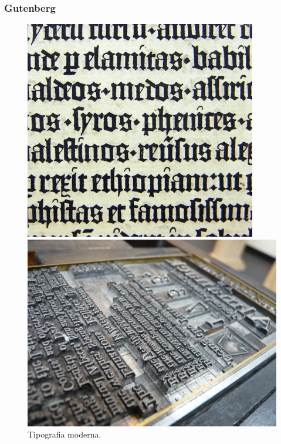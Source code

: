 \begin{frame}
\frametitle{Gutenberg}
\begin{figure}[htbp]
\begin{minipage}[t]{0.47\textwidth}
\includegraphics[width=0.8\linewidth,height=0.5\textheight,keepaspectratio]{figures/gutenberg.jpg}
\end{minipage}
\hfill
\begin{minipage}[t]{0.47\textwidth}
\includegraphics[width=\linewidth,height=0.5\textheight,keepaspectratio]{figures/mov-type.jpg}
\end{minipage}
\caption{Tipografia moderna.}
\end{figure}
\end{frame}


